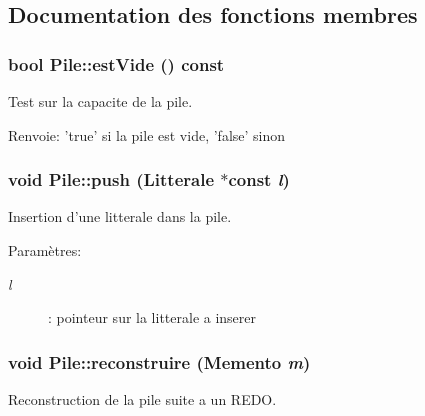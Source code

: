\subsection{Documentation des fonctions membres}
\hypertarget{class_pile_2ca7edab82a4b7a4305093dd9ab14d71}{
\subsubsection[{estVide}]{\setlength{\rightskip}{0pt plus 5cm}bool Pile::estVide () const}}
\label{class_pile_2ca7edab82a4b7a4305093dd9ab14d71}


Test sur la capacite de la pile. 

\begin{Desc}
\item[Renvoie:]'true' si la pile est vide, 'false' sinon \end{Desc}
\hypertarget{class_pile_c61f214686f5c75fc71fc86ce8da53e0}{
\subsubsection[{push}]{\setlength{\rightskip}{0pt plus 5cm}void Pile::push ({\bf Litterale} $\ast$const  {\em l})}}
\label{class_pile_c61f214686f5c75fc71fc86ce8da53e0}


Insertion d'une litterale dans la pile. 

\begin{Desc}
\item[Paramètres:]
\begin{description}
\item[{\em l}]: pointeur sur la litterale a inserer \end{description}
\end{Desc}
\hypertarget{class_pile_47db93b6d3c9d527e9c4c8afb1565e2b}{
\subsubsection[{reconstruire}]{\setlength{\rightskip}{0pt plus 5cm}void Pile::reconstruire ({\bf Memento} {\em m})}}
\label{class_pile_47db93b6d3c9d527e9c4c8afb1565e2b}


Reconstruction de la pile suite a un REDO. 

